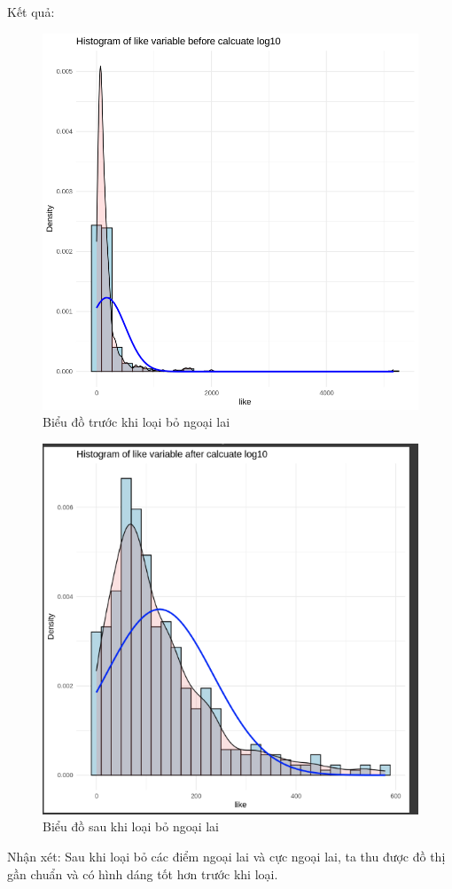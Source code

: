 \begin{itemize}
Kết quả:
\begin{figure}[H]
    \centering
    \includegraphics[width=0.8\linewidth]{part01_figures/22.png}
    \caption{Biểu đồ trước khi loại bỏ ngoại lai}
    \label{fig:Biểu đồ trước khi loại bỏ ngoại lai}
\end{figure}
\begin{figure}
    \centering
    \includegraphics[width=0.8\linewidth]{part23_figures/23.png}
    \caption{Biểu đồ sau khi loại bỏ ngoại lai}
    \label{fig:Biểu đồ sau khi loại bỏ ngoại lai}
\end{figure}
Nhận xét: Sau khi loại bỏ các điểm ngoại lai và cực ngoại lai, ta thu được đồ thị gần chuẩn và có hình dáng tốt hơn trước khi loại.



\end{itemize}
